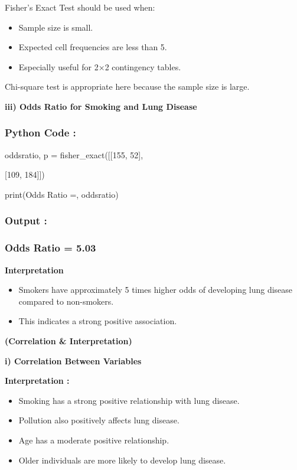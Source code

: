 \documentclass[
]{article}
\begin{document}
Fisher's Exact Test should be used when:

\begin{itemize}
\item
  Sample size is small.
\item
  Expected cell frequencies are less than 5.
\item
  Especially useful for 2×2 contingency tables.
\end{itemize}

Chi-square test is appropriate here because the sample size is large.

\textbf{iii) Odds Ratio for Smoking and Lung Disease}

\subsubsection{Python Code :}\label{python-code-2}

oddsratio, p = fisher\_exact({[}{[}155, 52{]},

{[}109, 184{]}{]})

print(\textquotesingle Odds Ratio =\textquotesingle, oddsratio)

\subsubsection{Output :}\label{output}

\subsubsection{Odds Ratio = 5.03}\label{odds-ratio-5.03}

\textbf{Interpretation}

\begin{itemize}
\item
  Smokers have approximately 5 times higher odds of developing lung
  disease compared to non-smokers.
\item
  This indicates a strong positive association.
\end{itemize}

\textbf{(Correlation \& Interpretation)}

\textbf{i) Correlation Between Variables}

\textbf{Interpretation :}

\begin{itemize}
\item
  Smoking has a strong positive relationship with lung disease.
\item
  Pollution also positively affects lung disease.
\item
  Age has a moderate positive relationship.
\item
  Older individuals are more likely to develop lung disease.
\end{itemize}
\end{document}
